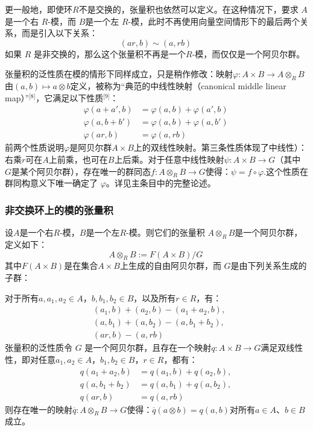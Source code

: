 更一般地，即使环\( R \)不是交换的，张量积也依然可以定义。在这种情况下，要求 \( A \)是一个右 \( R \)-模，而 \( B \)是一个左 \( R \)-模，此时不再使用向量空间情形下的最后两个关系，而是引入以下关系：
\[
(ar, b) \sim (a, rb)~
\]
如果 \( R \) 是非交换的，那么这个张量积不再是一个\( R \)-模，而仅仅是一个阿贝尔群。

张量积的泛性质在模的情形下同样成立，只是稍作修改：映射\(\varphi : A \times B \to A \otimes_R B\)由\((a, b) \mapsto a \otimes b\)定义，被称为“典范的中线性映射（canonical middle linear map）”\(^\text{[8]}\)，它满足以下性质\(^\text{[9]}\)：
\[
\begin{aligned}
\varphi(a + a', b) &= \varphi(a, b) + \varphi(a', b) \\
\varphi(a, b + b') &= \varphi(a, b) + \varphi(a, b') \\
\varphi(ar, b) &= \varphi(a, rb)
\end{aligned}~
\]
前两个性质说明\( \varphi \)是阿贝尔群\( A \times B \)上的双线性映射。第三条性质体现了中线性）：右乘\( r \)可在\( A \)上前乘，也可在\( B \)上后乘。对于任意中线性映射\( \psi : A \times B \to G \)（其中 \( G \)是某个阿贝尔群），存在唯一的群同态\( f : A \otimes_R B \to G \)使得：\(\psi = f \circ \varphi\).这个性质在群同构意义下唯一确定了 \( \varphi \)。详见主条目中的完整论述。
\subsubsection{非交换环上的模的张量积}
设\( A \)是一个右\( R \)-模，\( B \)是一个左\( R \)-模。则它们的张量积 \( A \otimes_R B \)是一个阿贝尔群，定义如下：
\[
A \otimes_R B := F(A \times B) / G~
\]
其中\( F(A \times B) \)是在集合\( A \times B \)上生成的自由阿贝尔群，而 \( G \)是由下列关系生成的子群：

对于所有\( a, a_1, a_2 \in A \)，\( b, b_1, b_2 \in B \)，以及所有\( r \in R \)，有：
\[
\begin{aligned}
&(a_1, b) + (a_2, b) - (a_1 + a_2, b), \\
&(a, b_1) + (a, b_2) - (a, b_1 + b_2), \\
&(ar, b) - (a, rb)
\end{aligned}~
\]
张量积的泛性质令 \( G \) 是一个阿贝尔群，且存在一个映射\(q : A \times B \to G\)满足双线性性，即对任意\( a_1, a_2 \in A \)，\( b_1, b_2 \in B \)，\( r \in R \)，都有：
\[
\begin{aligned}
q(a_1 + a_2, b) &= q(a_1, b) + q(a_2, b), \\
q(a, b_1 + b_2) &= q(a, b_1) + q(a, b_2), \\
q(ar, b) &= q(a, rb)
\end{aligned}~
\]
则存在唯一的映射\(\overline{q} : A \otimes_R B \to G\)使得：\(\overline{q}(a \otimes b) = q(a, b)\)对所有\( a \in A \)、\( b \in B \) 成立。


